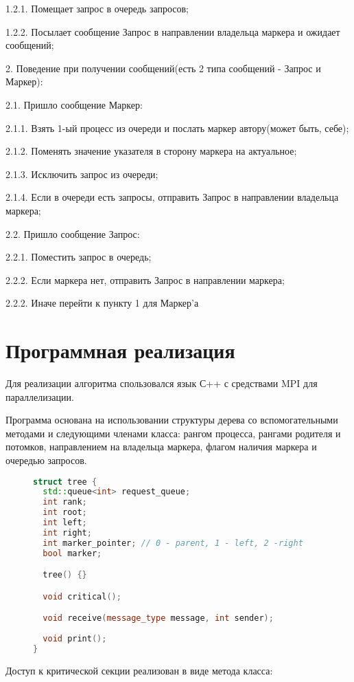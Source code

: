 \documentclass[12pt, oneside, a4paper]{article}
\begin{document}
1.2.1. Помещает запрос в очередь запросов;

1.2.2. Посылает сообщение Запрос в направлении владельца маркера и ожидает сообщений;

2. Поведение при получении сообщений(есть 2 типа сообщений - Запрос и Маркер):

2.1. Пришло сообщение Маркер:

2.1.1. Взять 1-ый процесс из очереди и послать маркер автору(может быть, себе);

2.1.2. Поменять значение указателя в сторону маркера на актуальное;

2.1.3. Исключить запрос из очереди;

2.1.4. Если в очереди есть запросы, отправить Запрос в направлении владельца маркера;

2.2. Пришло сообщение Запрос:

2.2.1. Поместить запрос в очередь;

2.2.2. Если маркера нет, отправить Запрос в направлении маркера;

2.2.2. Иначе перейти к пункту 1 для Маркер'а

\section{Программная реализация}

Для реализации алгоритма спользовался язык С++ с средствами MPI для параллелизации.

Программа основана на использовании структуры дерева со вспомогательными методами и следующими членами класса: рангом процесса, рангами родителя и потомков, направлением на владельца маркера, флагом наличия маркера и очередью запросов.

\begin{figure}[h]
\begin{lstlisting}[language=C++]
struct tree {
  std::queue<int> request_queue;
  int rank;
  int root;
  int left;
  int right;
  int marker_pointer; // 0 - parent, 1 - left, 2 -right
  bool marker;

  tree() {}

  void critical();

  void receive(message_type message, int sender);
  
  void print();
}
\end{lstlisting}
\end{figure}

Доступ к критической секции реализован в виде метода класса:
\end{document}
